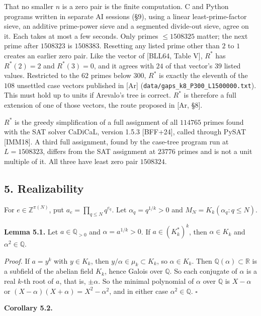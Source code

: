 \documentclass[
]{amsart}
\begin{document}
That no smaller \(n\) is a zero pair is the finite computation. C and
Python programs written in separate AI sessions (§9), using a linear
least-prime-factor sieve, an additive prime-power sieve and a segmented
divide-out sieve, agree on it. Each takes at most a few seconds. Only
primes \(\le1508325\) matter; the next prime after \(1508323\) is
\(1508383\). Resetting any listed prime other than \(2\) to \(1\)
creates an earlier zero pair. Like the vector of {[}BLL64, Table V{]},
\(R^*\) has \(R^*(2)=2\) and \(R^*(3)=0\), and it agrees with \(24\) of
that vector's \(39\) listed values. Restricted to the \(62\) primes
below \(300\), \(R^*\) is exactly the eleventh of the \(108\) unsettled
case vectors published in {[}Ar{]}
(\texttt{data/gaps\_k8\_P300\_L1500000.txt}). This must hold up to units
if Arevalo's tree is correct. \(R^*\) is therefore a full extension of
one of those vectors, the route proposed in {[}Ar, §8{]}.

\(R^*\) is the greedy simplification of a full assignment of all
\(114765\) primes found with the SAT solver CaDiCaL, version 1.5.3
{[}BFF+24{]}, called through PySAT {[}IMM18{]}. A third full assignment,
found by the case-tree program run at \(L=1508323\), differs from the
SAT assignment at \(23776\) primes and is not a unit multiple of it. All
three have least zero pair \(1508324\).

\hypertarget{realizability}{%
\subsection{5. Realizability}\label{realizability}}

For \(e\in\mathbb{Z}^{\pi(N)}\), put \(a_e=\prod_{q\le N}q^{e_q}\). Let
\(\alpha_q=q^{1/k}>0\) and \(M_N=K_k(\alpha_q:q\le N)\).

\textbf{Lemma 5.1.} Let \(a\in\mathbb{Q}_{>0}\) and
\(\alpha=a^{1/k}>0\). If \(a\in(K_k^*)^k\), then \(\alpha\in K_k\) and
\(\alpha^2\in\mathbb{Q}\).

\emph{Proof.} If \(a=y^k\) with \(y\in K_k\), then
\(y/\alpha\in\mu_k\subset K_k\), so \(\alpha\in K_k\). Then
\(\mathbb{Q}(\alpha)\subset\mathbb{R}\) is a subfield of the abelian
field \(K_k\), hence Galois over \(\mathbb{Q}\). So each conjugate of
\(\alpha\) is a real \(k\)-th root of \(a\), that is, \(\pm\alpha\). So
the minimal polynomial of \(\alpha\) over \(\mathbb{Q}\) is \(X-\alpha\)
or \((X-\alpha)(X+\alpha)=X^2-\alpha^2\), and in either case
\(\alpha^2\in\mathbb{Q}\). \(\square\)

\textbf{Corollary 5.2.}
\end{document}
